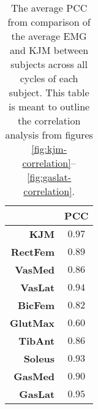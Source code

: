 \begin{table}[]
    \centering
    \caption{The average \acf{PCC} from comparison of the average \ac{EMG} and \ac{KJM} between subjects across all cycles of each subject. This table is meant to outline the correlation analysis from figures \ref{fig:kjm-correlation}--\ref{fig:gaslat-correlation}.}
    \begin{tabular}{r|c}
         &  \textbf{\ac{PCC}} \\ \hline
        \textbf{\ac{KJM}} & $0.97$ \\
        \textbf{RectFem} & $0.89$ \\
        \textbf{VasMed} & $0.86$ \\
        \textbf{VasLat} & $0.94$ \\
        \textbf{BicFem} & $0.82$ \\
        \textbf{GlutMax} & $0.60$ \\
        \textbf{TibAnt} & $0.86$ \\
        \textbf{Soleus} & $0.93$ \\
        \textbf{GasMed} & $0.90$ \\
        \textbf{GasLat} & $0.95$\\ \hline
    \end{tabular}
    \label{tab:correlation-sumup}
\end{table}
